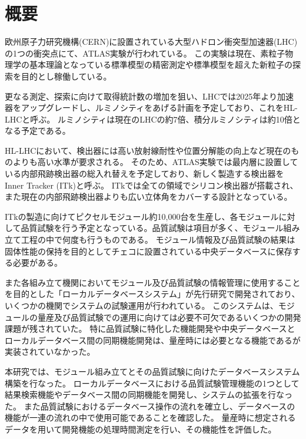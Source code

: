 \chapter*{概要}

欧州原子力研究機構(CERN)に設置されている大型ハドロン衝突型加速器(LHC)の1つの衝突点にて、ATLAS実験が行われている。
この実験は現在、素粒子物理学の基本理論となっている標準模型の精密測定や標準模型を超えた新粒子の探索を目的とし稼働している。

更なる測定、探索に向けて取得統計数の増加を狙い、LHCでは2025年より加速器をアップグレードし、ルミノシティをあげる計画を予定しており、これをHL-LHCと呼ぶ。
ルミノシティは現在のLHCの約7倍、積分ルミノシティは約10倍となる予定である。

HL-LHCにおいて、検出器には高い放射線耐性や位置分解能の向上など現在のものよりも高い水準が要求される。
そのため、ATLAS実験では最内層に設置している内部飛跡検出器の総入れ替えを予定しており、新しく製造する検出器をInner Tracker (ITk)と呼ぶ。
ITkでは全ての領域でシリコン検出器が搭載され、また現在の内部飛跡検出器よりも広い立体角をカバーする設計となっている。

ITkの製造に向けてピクセルモジュール約10,000台を生産し、各モジュールに対して品質試験を行う予定となっている。品質試験は項目が多く、モジュール組み立て工程の中で何度も行うものである。
モジュール情報及び品質試験の結果は固体性能の保持を目的としてチェコに設置されている中央データベースに保存する必要がある。

また各組み立て機関においてモジュール及び品質試験の情報管理に使用することを目的とした「ローカルデータベースシステム」が先行研究で開発されており、いくつかの機関でシステムの試験運用が行われている。
このシステムは、モジュールの量産及び品質試験での運用に向けては必要不可欠であるいくつかの開発課題が残されていた。
特に品質試験に特化した機能開発や中央データベースとローカルデータベース間の同期機能開発は、量産時には必要となる機能であるが実装されていなかった。

本研究では、モジュール組み立てとその品質試験に向けたデータベースシステム構築を行なった。
ローカルデータベースにおける品質試験管理機能の1つとして結果検索機能やデータベース間の同期機能を開発し、システムの拡張を行なった。
また品質試験におけるデータベース操作の流れを確立し、データベースの機能が一連の流れの中で使用可能であることを確認した。
量産時に想定されるデータを用いて開発機能の処理時間測定を行い、その機能性を評価した。


